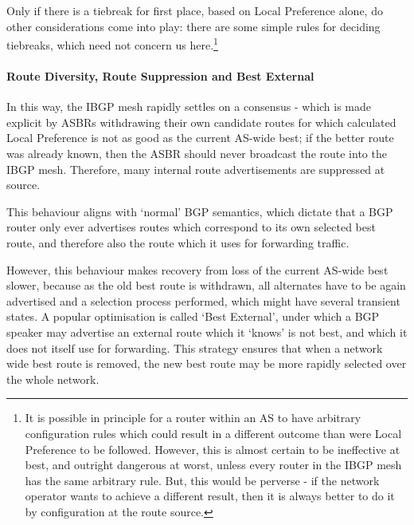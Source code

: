 Only if  there is a tiebreak for first place, based on Local Preference alone, do other considerations come into play:  there are some simple rules for deciding tiebreaks, which need not concern us
here.\footnote{It is possible in principle for a router within an AS to have arbitrary configuration rules which could result in a different outcome than were Local Preference to be followed.
	However, this is almost certain to be ineffective at best, and outright dangerous at worst, unless every router in the IBGP mesh has the same arbitrary rule.  But, this would be perverse - if the network operator wants to achieve a different result, then it is always better to do it by configuration at the route source.}

\paragraph{Route Diversity, Route Suppression and Best External}
In this way, the IBGP mesh rapidly settles on a consensus - which is made explicit by ASBRs withdrawing their own candidate routes for which
calculated Local Preference is not as good as the current AS-wide best; if the better route was already  known, then the ASBR should never broadcast the route into the IBGP mesh.
Therefore, many internal route advertisements are suppressed at source.

This behaviour aligns with `normal' BGP semantics, which dictate that a BGP
router only ever advertises routes which correspond to its own selected best route,
and therefore also the route which it uses for forwarding traffic.

However, this behaviour makes recovery from loss of the current AS-wide best slower,
because as the old best route is withdrawn, all alternates have to be again
advertised and a selection process performed, which might have several transient
states.  A popular optimisation is called `Best External'\cite{marques2012}, under which a BGP
speaker may advertise an external route which it `knows' is not best, and which
it does not itself use for forwarding.	This strategy ensures that when a
network wide best route is removed, the new best route may be more rapidly
selected over the whole network.

